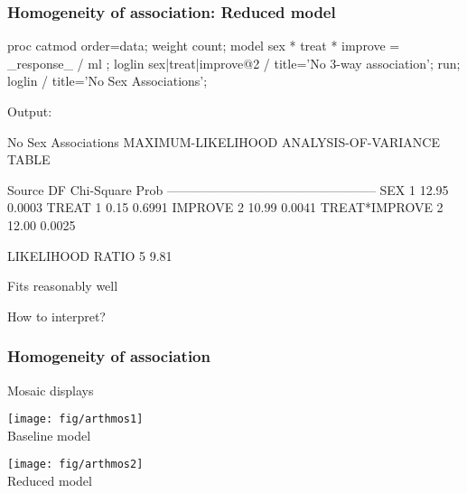 \begin{frame}[fragile]
  \frametitle{Homogeneity of association: Reduced model}
\begin{Input}[fontsize=\footnotesize,label=\fbox{$\cdots$ \texttt{arthfreq.sas}},baselinestretch=0.8,firstnumber=30]
proc catmod order=data;
   weight count;
   model sex * treat * improve = _response_ / ml ;
   loglin sex|treat|improve@2 / title='No 3-way association';
run;
   loglin    / title='No Sex Associations';
\end{Input}
Output:
\begin{Output}[baselinestretch=0.75]
                   No Sex Associations
      MAXIMUM-LIKELIHOOD ANALYSIS-OF-VARIANCE TABLE

    Source                   DF   Chi-Square      Prob
    --------------------------------------------------
    SEX                       1        12.95    0.0003
    TREAT                     1         0.15    0.6991
    IMPROVE                   2        10.99    0.0041
    TREAT*IMPROVE             2        12.00    0.0025

    LIKELIHOOD RATIO          5         9.81    
\end{Output}
  \begin{itemize*}
  \item Fits reasonably well
  \item How to interpret?
  \end{itemize*}

\end{frame}

\begin{frame}
  \frametitle{Homogeneity of association}
 Mosaic displays

\vspace{2ex}
 \begin{minipage}[b]{.5\linewidth}
  \centering
  \texttt{[image: fig/arthmos1]} \\ Baseline model
 \end{minipage}%
 \begin{minipage}[b]{.5\linewidth}
  \centering
  \texttt{[image: fig/arthmos2]}  \\ Reduced model
 \end{minipage}

\end{frame}

\endinput

\begin{frame}
  \frametitle{}
  \begin{itemize}
	\item{\large\bfseries }
      \begin{itemize*}
	  \item 
    	\begin{itemize*}
		\item 
		\item 
		\end{itemize*}
	  \item 
	  \end{itemize*}
	\item{\large\bfseries }
	\item{\large\bfseries }
  \end{itemize}
\end{frame}

